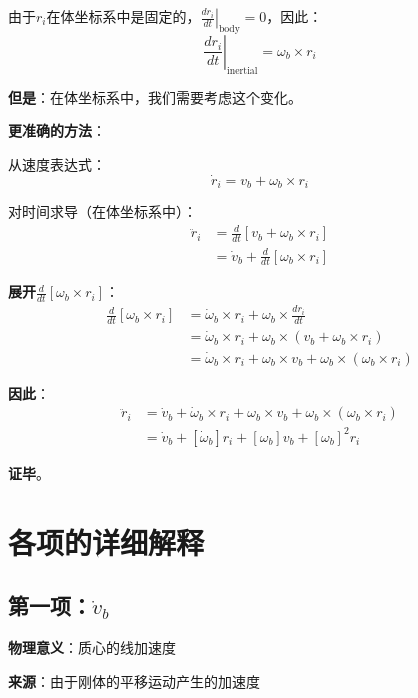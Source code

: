 \documentclass[12pt,a4paper]{article}
\begin{document}
由于$r_i$在体坐标系中是固定的，$\left.\frac{dr_i}{dt}\right|_{\text{body}} = 0$，因此：
\begin{equation}
\left.\frac{dr_i}{dt}\right|_{\text{inertial}} = \omega_b \times r_i
\end{equation}

\textbf{但是}：在体坐标系中，我们需要考虑这个变化。

\textbf{更准确的方法}：

从速度表达式：
\begin{equation}
\dot{r}_i = v_b + \omega_b \times r_i
\end{equation}

对时间求导（在体坐标系中）：
\begin{align}
\ddot{r}_i &= \frac{d}{dt}[v_b + \omega_b \times r_i] \\
&= \dot{v}_b + \frac{d}{dt}[\omega_b \times r_i]
\end{align}

\textbf{展开$\frac{d}{dt}[\omega_b \times r_i]$}：
\begin{align}
\frac{d}{dt}[\omega_b \times r_i] &= \dot{\omega}_b \times r_i + \omega_b \times \frac{dr_i}{dt} \\
&= \dot{\omega}_b \times r_i + \omega_b \times (v_b + \omega_b \times r_i) \\
&= \dot{\omega}_b \times r_i + \omega_b \times v_b + \omega_b \times (\omega_b \times r_i)
\end{align}

\textbf{因此}：
\begin{align}
\ddot{r}_i &= \dot{v}_b + \dot{\omega}_b \times r_i + \omega_b \times v_b + \omega_b \times (\omega_b \times r_i) \\
&= \dot{v}_b + [\dot{\omega}_b] r_i + [\omega_b] v_b + [\omega_b]^2 r_i
\end{align}

\textbf{证毕}。

\section{各项的详细解释}

\subsection{第一项：$\dot{v}_b$}

\textbf{物理意义}：质心的线加速度

\textbf{来源}：由于刚体的平移运动产生的加速度
\end{document}
